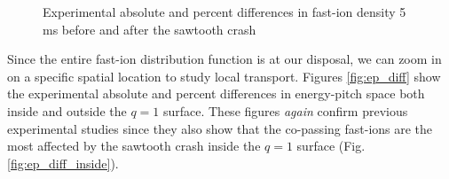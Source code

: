 \begin{figure}[h!]
    \centering
    \caption{Experimental absolute and percent differences in fast-ion density 5 ms before and after the sawtooth crash}
\end{figure}
Since the entire fast-ion distribution function is at our disposal, we can zoom in on a specific spatial location to study local transport. Figures \ref{fig:ep_diff} show the experimental absolute and percent differences in energy-pitch space both inside and outside the $q=1$ surface. These figures \emph{again} confirm previous experimental studies since they also show that the co-passing fast-ions are the most affected by the sawtooth crash inside the $q=1$ surface (Fig. \ref{fig:ep_diff_inside}).  
